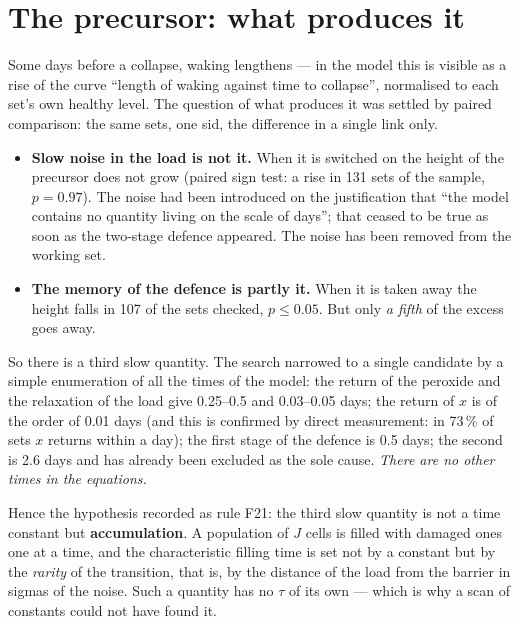 \section{The precursor: what produces it}\label{sec:prodrome}
Some days before a collapse, waking lengthens --- in the model this is visible as a rise of the curve ``length of waking against time to collapse'', normalised to each set's own healthy level. The question of what produces it was settled by paired comparison: the same sets, one sid, the difference in a single link only.

\begin{itemize}
\item \textbf{Slow noise in the load is not it.} When it is switched on the height of the precursor does not grow (paired sign test: a rise in 131 sets of the sample, $p=0.97$). The noise had been introduced on the justification that ``the model contains no quantity living on the scale of days''; that ceased to be true as soon as the two-stage defence appeared. The noise has been removed from the working set.
\item \textbf{The memory of the defence is partly it.} When it is taken away the height falls in 107 of the sets checked, $p\le0.05$. But only \emph{a fifth} of the excess goes away.
\end{itemize}

So there is a third slow quantity. The search narrowed to a single candidate by a simple enumeration of all the times of the model: the return of the peroxide and the relaxation of the load give 0.25--0.5 and 0.03--0.05 days; the return of $x$ is of the order of 0.01 days (and this is confirmed by direct measurement: in 73\,\% of sets $x$ returns within a day); the first stage of the defence is 0.5 days; the second is 2.6 days and has already been excluded as the sole cause. \emph{There are no other times in the equations.}

Hence the hypothesis recorded as rule F21: the third slow quantity is not a time constant but \textbf{accumulation}. A population of $J$ cells is filled with damaged ones one at a time, and the characteristic filling time is set not by a constant but by the \emph{rarity} of the transition, that is, by the distance of the load from the barrier in sigmas of the noise. Such a quantity has no $\tau$ of its own --- which is why a scan of constants could not have found it.
